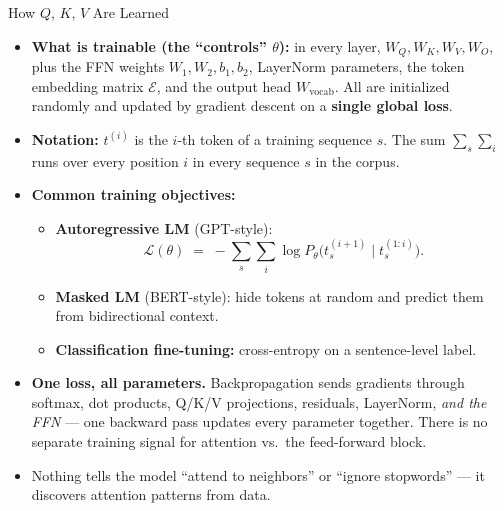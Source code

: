 \documentclass[10pt,english,aspectratio=169]{beamer}
\begin{document}
\begin{frame}{How $Q$, $K$, $V$ Are Learned}
\begin{itemize}
\item \textbf{What is trainable (the ``controls'' $\theta$):} in every layer, $W_{Q}, W_{K}, W_{V}, W_{O}$, plus the FFN weights $W_{1}, W_{2}, b_{1}, b_{2}$, LayerNorm parameters, the token embedding matrix $\mathcal{E}$, and the output head $W_{\text{vocab}}$. All are initialized randomly and updated by gradient descent on a \textbf{single global loss}.

\medskip
\item \textbf{Notation:} $t^{(i)}$ is the $i$-th token of a training sequence $s$. The sum $\sum_{s}\sum_{i}$ runs over every position $i$ in every sequence $s$ in the corpus.

\medskip
\item \textbf{Common training objectives:}
\begin{itemize}
    \item \textbf{Autoregressive LM} (GPT-style):
    \[
       \mathcal{L}(\theta) \;=\; -\sum_{s}\sum_{i} \log P_{\theta}\bigl(t_{s}^{(i+1)} \mid t_{s}^{(1:i)}\bigr).
    \]
    \item \textbf{Masked LM} (BERT-style): hide tokens at random and predict them from bidirectional context.
    \item \textbf{Classification fine-tuning:} cross-entropy on a sentence-level label.
\end{itemize}

\medskip
\item \textbf{One loss, all parameters.} Backpropagation sends gradients through softmax, dot products, Q/K/V projections, residuals, LayerNorm, \emph{and the FFN} --- one backward pass updates every parameter together. There is no separate training signal for attention vs.\ the feed-forward block.

\medskip
\item Nothing tells the model ``attend to neighbors'' or ``ignore stopwords'' --- it discovers attention patterns from data.
\end{itemize}
\end{frame}
\end{document}
